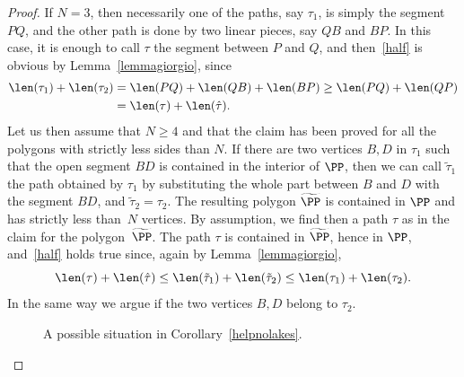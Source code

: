 \begin{proof}
If $N=3$, then necessarily one of the paths, say $\tau_1$, is simply the segment $PQ$, and the other path is done by two linear pieces, say $QB$ and $BP$. In this case, it is enough to call $\tau$ the segment between $P$ and $Q$, and then~\eqref{half} is obvious by Lemma~\ref{lemmagiorgio}, since
\[\begin{split}
\len(\tau_1)+\len(\tau_2) &= \len(PQ) + \len(QB)+\len(BP) \geq \len (PQ) + \len(QP) \\
&=\len(\tau) + \len(\hat\tau) .
\end{split}\]
Let us then assume that $N\geq 4$ and that the claim has been proved for all the polygons with strictly less sides than $N$. If there are two vertices $B, D$ in $\tau_1$ such that the open segment $BD$ is contained in the interior of $\PP$, then we can call $\tilde\tau_1$ the path obtained by $\tau_1$ by substituting the whole part between $B$ and $D$ with the segment $BD$, and $\tilde\tau_2=\tau_2$. The resulting polygon $\widetilde\PP$ is contained in $\PP$ and has strictly less than~$N$ vertices. By assumption, we find then a path $\tau$ as in the claim for the polygon~$\widetilde\PP$. The path $\tau$ is contained in $\widetilde\PP$, hence in $\PP$, and~\eqref{half} holds true since, again by Lemma~\ref{lemmagiorgio},
\[
\len(\tau)+\len(\hat\tau) \leq \len(\tilde\tau_1) + \len(\tilde\tau_2) \leq \len(\tau_1)+\len(\tau_2).
\]
In the same way we argue if the two vertices $B, D$ belong to $\tau_2$.\par
\begin{figure}[htbp]
\caption{A possible situation in Corollary~\ref{helpnolakes}.}\label{FigFra}
\end{figure}

\end{proof}
